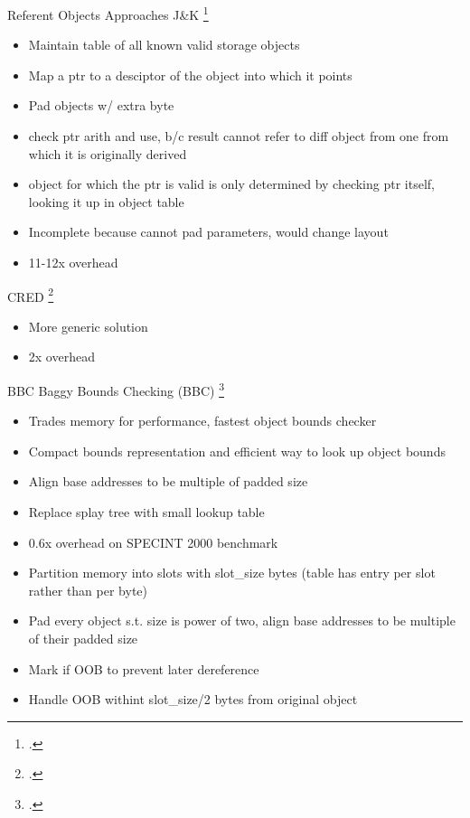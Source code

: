 \begin{frame}{Referent Objects Approaches}
\footnotesize
J\&K \footcite{jones_backwards-compatible_1997}
    \begin{itemize}
       \item Maintain table of all known valid storage objects
       \item Map a ptr to a desciptor of the object into which it points
       \item Pad objects w/ extra byte
       \item check ptr arith and use, b/c result cannot refer to diff object from one from which it is originally derived
       \item object for which the ptr is valid is only determined by checking ptr itself, looking it up in object table
       \item Incomplete because cannot pad parameters, would change layout
       \item 11-12x overhead
    \end{itemize}

CRED \footcite{ruwase_practical_2004}
    \begin{itemize}
      \item More generic solution
      \item 2x overhead
    \end{itemize}
\vspace{0.2in}
\end{frame}

\begin{frame}{BBC}
\footnotesize
Baggy Bounds Checking (BBC) \footcite{akritidis_baggy_2009}
    \begin{itemize}
    \item Trades memory for performance, fastest object bounds checker
    \item Compact bounds representation and efficient way to look up object bounds
    \item Align base addresses to be multiple of padded size
    \item Replace splay tree with small lookup table
    \item 0.6x overhead on SPECINT 2000 benchmark
    \item Partition memory into slots with slot\_size bytes (table has entry per slot rather than per byte)
    \item Pad every object s.t. size is power of two, align base addresses to be multiple of their padded size
    \item Mark if OOB to prevent later dereference
    \item Handle OOB withint slot\_size/2 bytes from original object
    \end{itemize}
\vspace{0.2in}
\end{frame}

